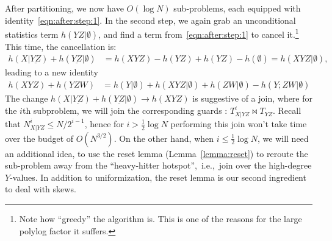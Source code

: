 \documentclass[10pt,a4paper]{article}
\begin{document}
After partitioning, we now have $O(\log N)$ sub-problems, each equipped with
identity~\eqref{eqn:after:step:1}. In the second step, we again grab an unconditional
statistics term $h(YZ|\emptyset)$, and find a term from~\eqref{eqn:after:step:1} to
cancel it.\footnote{Note how ``greedy'' the algorithm is. This is one of the reasons for the
large polylog factor it suffers.} This time, the cancellation is:
%
\begin{align*}
  h(X|\underline{YZ})+h(\underline{YZ}|\emptyset) &=
  h(XYZ)-h(YZ)+h(YZ)-h(\emptyset) =h(XYZ|\emptyset),
\end{align*}
%
leading to a new identity
%
\begin{align} \label{eqn:after:step:2}
  h(XYZ)+h(YZW) &= h(Y|\emptyset)+h(XYZ|\emptyset) + h(ZW|\emptyset)- h(Y;ZW|\emptyset)
\end{align}
%
The change $h(X|\underline{YZ})+h(\underline{YZ}|\emptyset) \to h(XYZ)$ is suggestive of a
join, where for the $i$th subproblem, we will join the corresponding guards : $T^i_{X|YZ}
\Join T_{YZ}$. Recall that $N^i_{X|YZ} \leq N/2^{i-1}$, hence for $i > \frac 1 2 \log N$
performing this join won't take time over the budget of $O(N^{3/2})$. On the other hand,
when $i \leq \frac 1 2 \log N$, we will need an additional idea, to use the reset lemma
(Lemma~\ref{lemma:reset}) to reroute the sub-problem away from the ``heavy-hitter hotspot'',~i.e.,~join over the high-degree $Y$-values. In
addition to uniformization, the reset lemma is our second ingredient to deal with skews.
\end{document}
